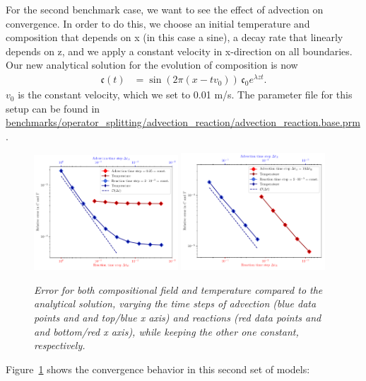 \documentclass{article}
\begin{document}
For the second benchmark case, we want to see the effect of advection on convergence. 
In order to do this, we choose an initial temperature and composition that depends on x (in this case a sine), a decay rate that linearly depends on z, and we apply a constant velocity in x-direction on all boundaries. Our new analytical solution for the evolution of composition is now
 \begin{align}
  \mathfrak{c}(t) 
  &=
  \sin (2\pi(x-t v_0)) \, \mathfrak{c}_0 e^{\lambda z t}.
\end{align}
$v_0$ is the constant velocity, which we set to 0.01 m/s. 
The parameter file for this setup can be found in \url{benchmarks/operator_splitting/advection_reaction/advection_reaction.base.prm}. 
\begin{figure}
  \begin{center}
    \includegraphics[width=0.48\textwidth]{cookbooks/benchmarks/operator_splitting/error_advection_reaction.pdf}
    \includegraphics[width=0.48\textwidth]{cookbooks/benchmarks/operator_splitting/error_advection_reaction2.pdf}
  \end{center}
  \caption{\it Error for both compositional field and temperature compared to the analytical solution, varying the time steps of advection (blue data points and and top/blue x axis) and reactions (red data points and and bottom/red x axis), while keeping the other one constant, respectively.}
  \label{fig:advection-reaction}
\end{figure}
Figure~\ref{fig:advection-reaction} shows the convergence behavior in this second set of models: 
\end{document}
